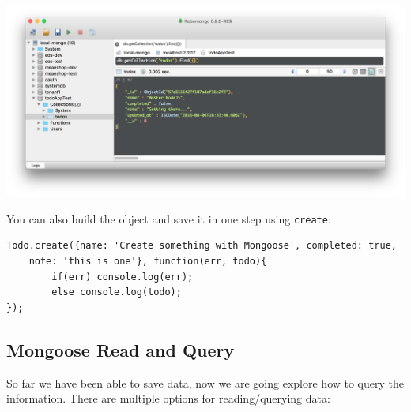 \documentclass[12pt]{article}
\begin{document}
\includegraphics[width=\textwidth]{images/robomongo}

You can also build the object and save it in one step using
\texttt{create}:
\begin{Verbatim}
Todo.create({name: 'Create something with Mongoose', completed: true, 
	note: 'this is one'}, function(err, todo){  
		if(err) console.log(err);  
		else console.log(todo);
});
\end{Verbatim}

\subsection{Mongoose Read and Query}

So far we have been able to save data, now we are going explore how to
query the information. There are multiple options for reading/querying
data:
\end{document}
